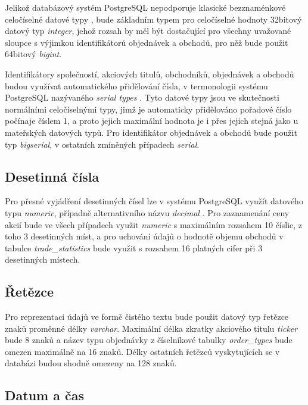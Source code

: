 \documentclass[thesis=M,czech]{FITthesis}[2012/06/26]
\begin{document}
Jelikož databázový systém PostgreSQL nepodporuje klasické bezznaménkové celočíselné datové typy \cite{pgdoc}, bude základním 
typem pro celočíselné hodnoty 32bitový datový typ \textit{integer}, jehož rozsah by měl být dostačující pro všechny uvažované sloupce 
s výjimkou identifikátorů objednávek a obchodů, pro něž bude použit 64bitový \textit{bigint}. 

Identifikátory společností, akciových titulů, obchodníků, objednávek a obchodů budou využívat automatického přidělování čísla, 
v termonologii systému PostgreSQL nazývaného \textit{serial types} \cite{pgdoc}. Tyto datové typy jsou ve skutečnosti normálními
celočíselnými typy, jimž je automaticky přidělováno pořadové číslo počínaje číslem 1, a proto jejich maximální hodnota je i přes jejich 
 stejná jako u mateřských datových typů. Pro identifikátor objednávek a obchodů bude použit typ \textit{bigserial}, 
v ostatních zmíněných případech \textit{serial}.


\subsection{Desetinná čísla}

Pro přesné vyjádření desetinných čísel lze v systému PostgreSQL využít datového typu \textit{numeric}, případně alternativního názvu 
\textit{decimal} \cite{pgdoc}. Pro zaznamenání ceny akcií bude ve všech případech využit \textit{numeric} s maximálním rozsahem 10 číslic, 
z toho 3 desetinných míst, a pro uchování údajů o hodnotě objemu obchodů v tabulce \textit{trade\_statistics} bude využit s rozsahem 
16 platných cifer při 3 desetinných místech.


\subsection{Řetězce}

Pro reprezentaci údajů ve formě čistého textu bude použit datový typ řetězce znaků proměnné délky \textit{varchar}. Maximální délka 
zkratky akciového titulu \textit{ticker} bude 8 znaků a název typu objednávky z číselníkové tabulky \textit{order\_types} bude omezen 
maximálně na 16 znaků. Délky ostatních řetězců vyskytujících se v databázi budou shodně omezeny na 128 znaků.


\subsection{Datum a čas}
\end{document}
